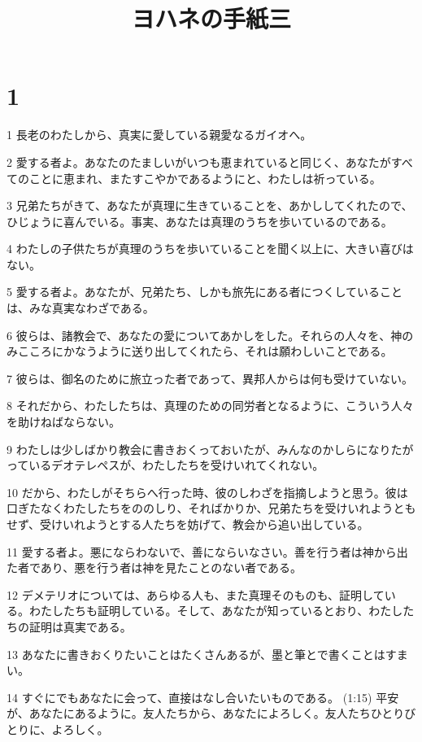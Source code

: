 

\title{ヨハネの手紙三}


\chapter{1}

\par 1 長老のわたしから、真実に愛している親愛なるガイオへ。
\par 2 愛する者よ。あなたのたましいがいつも恵まれていると同じく、あなたがすべてのことに恵まれ、またすこやかであるようにと、わたしは祈っている。
\par 3 兄弟たちがきて、あなたが真理に生きていることを、あかししてくれたので、ひじょうに喜んでいる。事実、あなたは真理のうちを歩いているのである。
\par 4 わたしの子供たちが真理のうちを歩いていることを聞く以上に、大きい喜びはない。
\par 5 愛する者よ。あなたが、兄弟たち、しかも旅先にある者につくしていることは、みな真実なわざである。
\par 6 彼らは、諸教会で、あなたの愛についてあかしをした。それらの人々を、神のみこころにかなうように送り出してくれたら、それは願わしいことである。
\par 7 彼らは、御名のために旅立った者であって、異邦人からは何も受けていない。
\par 8 それだから、わたしたちは、真理のための同労者となるように、こういう人々を助けねばならない。
\par 9 わたしは少しばかり教会に書きおくっておいたが、みんなのかしらになりたがっているデオテレペスが、わたしたちを受けいれてくれない。
\par 10 だから、わたしがそちらへ行った時、彼のしわざを指摘しようと思う。彼は口ぎたなくわたしたちをののしり、そればかりか、兄弟たちを受けいれようともせず、受けいれようとする人たちを妨げて、教会から追い出している。
\par 11 愛する者よ。悪にならわないで、善にならいなさい。善を行う者は神から出た者であり、悪を行う者は神を見たことのない者である。
\par 12 デメテリオについては、あらゆる人も、また真理そのものも、証明している。わたしたちも証明している。そして、あなたが知っているとおり、わたしたちの証明は真実である。
\par 13 あなたに書きおくりたいことはたくさんあるが、墨と筆とで書くことはすまい。
\par 14 すぐにでもあなたに会って、直接はなし合いたいものである。 (1:15) 平安が、あなたにあるように。友人たちから、あなたによろしく。友人たちひとりびとりに、よろしく。


